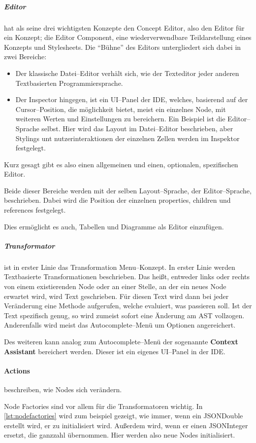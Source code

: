\subparagraph{Editor} hat als seine drei wichtigsten Konzepte den {\ttfamily Concept Editor}, also den Editor für ein Konzept; die {\ttfamily Editor Component}, eine wiederverwendbare Teildarstellung eines Konzepts und Stylesheets.
Die \enquote{Bühne} des Editors untergliedert sich dabei in zwei Bereiche:
\begin{itemize}
    \item Der klassische Datei--Editor verhält sich, wie der Texteditor jeder anderen Textbasierten Programmiersprache.
    \item Der Inspector hingegen, ist ein \ac{UI}--Panel der \ac{IDE}, welches, basierend auf der Cursor--Position, die möglichkeit bietet, meist ein einzelnes Node, mit weiteren Werten und Einstellungen zu bereichern.
    Ein Beispiel ist die Editor--Sprache selbst.
    Hier wird das Layout im Datei--Editor beschrieben, aber Stylings unt nutzerinteraktionen der einzelnen Zellen werden im Inspektor festgelegt.
\end{itemize}
Kurz gesagt gibt es also einen allgemeinen und einen, optionalen, spezifischen Editor.

Beide dieser Bereiche werden mit der selben Layout--Sprache, der Editor--Sprache, beschrieben.
Dabei wird die Position der einzelnen {\ttfamily properties}, {\ttfamily children} und {\ttfamily references} festgelegt.

Dies ermöglicht es auch, Tabellen und Diagramme als Editor einzufügen.

\subparagraph{Transformator} ist in erster Linie das {\ttfamily Transformation Menu}--Konzept.
In erster Linie werden Textbasierte Transformationen beschrieben.
Das heißt, entweder links oder rechts von einem existierenden Node oder an einer Stelle, an der ein neues Node erwartet wird, wird Text geschrieben.
Für diesen Text wird dann bei jeder Veränderung eine Methode aufgerufen, welche evaluiert, was passieren soll.
Ist der Text spezifisch genug, so wird zumeist sofort eine Änderung am \ac{AST} vollzogen.
Anderenfalls wird meist das Autocomplete--Menü um Optionen angereichert.

Des weiteren kann analog zum Autocomplete--Menü der sogenannte \textbf{Context Assistant} bereichert werden.
Dieser ist ein eigenes \acs{UI}--Panel in der \ac{IDE}.

\paragraph{Actions} beschreiben, wie Nodes sich verändern.

{\ttfamily Node Factories} sind vor allem für die Transformatoren wichtig.
In \autoref{lst:nodefactories} wird zum beispiel gezeigt, wie immer, wenn ein {\ttfamily JSONDouble} erstellt wird, er zu {} initialisiert wird.
Außerdem wird, wenn er einen {\ttfamily JSONInteger} ersetzt, die ganzzahl übernommen.
Hier werden also neue Nodes initialisiert.

